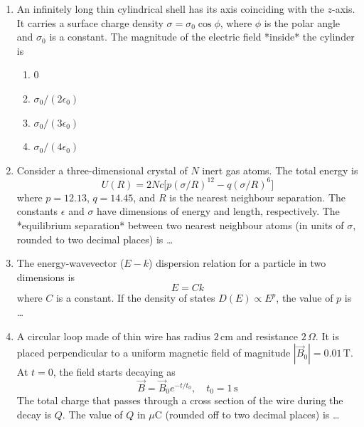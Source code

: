 \documentclass[journal,12pt,onecolumn]{IEEEtran}
\begin{document}
\begin{enumerate}[itemsep=0.45cm]
\item An infinitely long thin cylindrical shell has its axis coinciding with the $z$-axis. It carries a surface charge density $\sigma = \sigma_0 \cos\phi$, where $\phi$ is the polar angle and $\sigma_0$ is a constant.  
The magnitude of the electric field *inside* the cylinder is

\hfill{}

\begin{multicols}{4}
\begin{enumerate}
\item $0$
\item $\sigma_0/(2\epsilon_0)$
\item $\sigma_0/(3\epsilon_0)$
\item $\sigma_0/(4\epsilon_0)$
\end{enumerate}
\end{multicols}

\item Consider a three-dimensional crystal of $N$ inert gas atoms. The total energy is
\[
U(R) = 2 N c \big[ p (\sigma/R)^{12} - q (\sigma/R)^6 \big]
\]  
where $p = 12.13$, $q = 14.45$, and $R$ is the nearest neighbour separation. The constants $\epsilon$ and $\sigma$ have dimensions of energy and length, respectively.  
The *equilibrium separation* between two nearest neighbour atoms (in units of $\sigma$, rounded to two decimal places) is \dots

\hfill{}

\item The energy-wavevector ($E-k$) dispersion relation for a particle in two dimensions is
\[
E = C k
\]  
where $C$ is a constant. If the density of states $D(E) \propto E^p$, the value of $p$ is \dots

\hfill{}

\item A circular loop made of thin wire has radius $2\,\mathrm{cm}$ and resistance $2\,\Omega$. It is placed perpendicular to a uniform magnetic field of magnitude $|\vec{B}_0| = 0.01\,\mathrm{T}$. At $t=0$, the field starts decaying as
\[
\vec{B} = \vec{B}_0 e^{-t/t_0}, \quad t_0 = 1\,\mathrm{s}
\]  
The total charge that passes through a cross section of the wire during the decay is $Q$. The value of $Q$ in $\mu\mathrm{C}$ (rounded off to two decimal places) is \dots

\hfill{}

\newpage




\end{enumerate}
\end{document}
